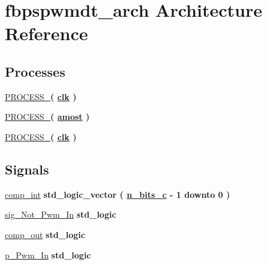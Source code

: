 \hypertarget{classfbpspwmdt_1_1fbpspwmdt__arch}{}\section{fbpspwmdt\+\_\+arch Architecture Reference}
\label{classfbpspwmdt_1_1fbpspwmdt__arch}
\subsection*{Processes}
 \begin{DoxyCompactItemize}
\item 
\hyperlink{classfbpspwmdt_1_1fbpspwmdt__arch_a6cc276b9a3076e40ac68b8ac3f1828a7}{P\+R\+O\+C\+E\+S\+S\+\_}{\bfseries  ( {\bfseries {\bfseries \hyperlink{classfbpspwmdt_a4a4609c199d30b3adebbeb3a01276ec5}{clk}} \textcolor{vhdlchar}{ }} )}
\item 
\hyperlink{classfbpspwmdt_1_1fbpspwmdt__arch_a7cf6ba78e659f286a9d61adf1efc91b0}{P\+R\+O\+C\+E\+S\+S\+\_}{\bfseries  ( {\bfseries {\bfseries \hyperlink{classfbpspwmdt_af9b8278b961604ab62a822537a109adb}{amost}} \textcolor{vhdlchar}{ }} )}
\item 
\hyperlink{classfbpspwmdt_1_1fbpspwmdt__arch_a0132bccb07ff42922281b99abe7fc1ed}{P\+R\+O\+C\+E\+S\+S\+\_}{\bfseries  ( {\bfseries {\bfseries \hyperlink{classfbpspwmdt_a4a4609c199d30b3adebbeb3a01276ec5}{clk}} \textcolor{vhdlchar}{ }} )}
\end{DoxyCompactItemize}
\subsection*{Signals}
 \begin{DoxyCompactItemize}
\item 
\hyperlink{classfbpspwmdt_1_1fbpspwmdt__arch_abf7d8be25624dd08fcc1517c8e39cb23}{comp\+\_\+int} {\bfseries \textcolor{comment}{std\+\_\+logic\+\_\+vector}\textcolor{vhdlchar}{ }\textcolor{vhdlchar}{(}\textcolor{vhdlchar}{ }\textcolor{vhdlchar}{ }\textcolor{vhdlchar}{ }\textcolor{vhdlchar}{ }{\bfseries \hyperlink{classfbpspwmdt_afee4aa1628956aa350183d8881689198}{n\+\_\+bits\+\_\+c}} \textcolor{vhdlchar}{-\/}\textcolor{vhdlchar}{ } \textcolor{vhdldigit}{1} \textcolor{vhdlchar}{ }\textcolor{keywordflow}{downto}\textcolor{vhdlchar}{ }\textcolor{vhdlchar}{ } \textcolor{vhdldigit}{0} \textcolor{vhdlchar}{ }\textcolor{vhdlchar}{)}\textcolor{vhdlchar}{ }} 
\item 
\hyperlink{classfbpspwmdt_1_1fbpspwmdt__arch_a90c7671dbb1af7d80f90cd96262cda3b}{sig\+\_\+\+Not\+\_\+\+Pwm\+\_\+\+In} {\bfseries \textcolor{comment}{std\+\_\+logic}\textcolor{vhdlchar}{ }} 
\item 
\hyperlink{classfbpspwmdt_1_1fbpspwmdt__arch_a5b5410422331d47dda25071eab458071}{comp\+\_\+out} {\bfseries \textcolor{comment}{std\+\_\+logic}\textcolor{vhdlchar}{ }} 
\item 
\hyperlink{classfbpspwmdt_1_1fbpspwmdt__arch_af7e8a49d46795da5945dc6b1f0602c13}{p\+\_\+\+Pwm\+\_\+\+In} {\bfseries \textcolor{comment}{std\+\_\+logic}\textcolor{vhdlchar}{ }} 
\end{DoxyCompactItemize}


